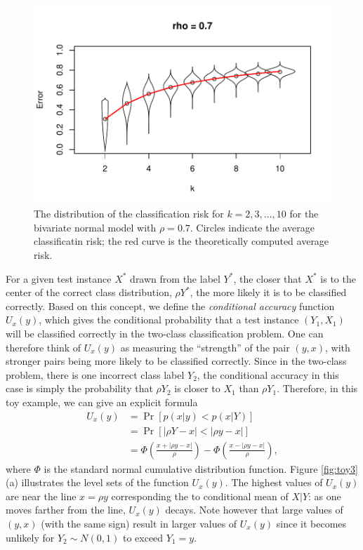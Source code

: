 \documentclass[12pt]{article}
\begin{document}
\begin{figure}[h]
\centering
\includegraphics[scale = 0.7, clip = true, trim = 0 0 0 0.5in]{extrapolation_figures/illus_err_0_7.pdf}

\caption{The distribution of the classification risk for $k = 2,3,\hdots, 10$ for the bivariate normal model with $\rho = 0.7$.
Circles indicate the average classificatin risk; the red curve is the theoretically computed average risk.}\label{fig:toy2}
\end{figure}

For a given test instance $X^*$ drawn from the label $Y^*$, the closer
that $X^*$ is to the center of the correct class distribution, $\rho
Y^*$, the more likely it is to be classified correctly.  Based on this
concept, we define the \emph{conditional accuracy} function $U_x(y)$,
which gives the conditional probability that a test instance $(Y_1,
X_1)$ will be classified correctly in the two-class classification
problem.  One can therefore think of $U_x(y)$ as measuring the
``strength'' of the pair $(y, x)$, with stronger pairs being more
likely to be classified correctly.  Since in the two-class problem,
there is one incorrect class label $Y_2$, the conditional accuracy in
this case is simply the probability that $\rho Y_2$ is closer to $X_1$
than $\rho Y_1$.  Therefore, in this toy example, we can give an
explicit formula
\begin{align*}
U_x(y) &= \Pr[p(x|y) < p(x|Y)]
\\&= \Pr[|\rho Y - x|< |\rho y - x|] 
\\&= \Phi\left(\frac{x + |\rho y - x|}{\rho}\right) - \Phi\left(\frac{x - |\rho y - x|}{\rho}\right),
\end{align*}
where $\Phi$ is the standard normal cumulative distribution function.
Figure \ref{fig:toy3}(a) illustrates the level sets of the function
$U_x(y)$.  The highest values of $U_x(y)$ are near the line $x = \rho
y$ corresponding the to conditional mean of $X|Y$: as one moves
farther from the line, $U_x(y)$ decays.  Note however that large
values of $(y, x)$ (with the same sign) result in larger values of
$U_x(y)$ since it becomes unlikely for $Y_2 \sim N(0,1)$ to exceed
$Y_1 = y$.
\end{document}
